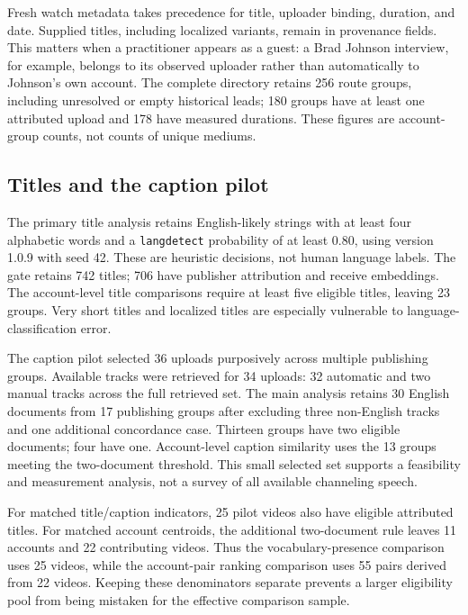 Fresh watch metadata takes precedence for title, uploader binding, duration, and date. Supplied titles, including localized variants, remain in provenance fields. This matters when a practitioner appears as a guest: a Brad Johnson interview, for example, belongs to its observed uploader rather than automatically to Johnson's own account. The complete directory retains 256 route groups, including unresolved or empty historical leads; 180 groups have at least one attributed upload and 178 have measured durations. These figures are account-group counts, not counts of unique mediums.

\begin{table}[t]
\centering

\caption{Coverage within the frozen index. Each row has its own unit and denominator; no row estimates a platform-wide population. Caption and matched-comparison subsets are described separately in the text.}
\label{tab:coverage}
\end{table}

\subsection{Titles and the caption pilot}
The primary title analysis retains English-likely strings with at least four alphabetic words and a \texttt{langdetect} probability of at least 0.80, using version 1.0.9 with seed 42. These are heuristic decisions, not human language labels. The gate retains 742 titles; 706 have publisher attribution and receive embeddings. The account-level title comparisons require at least five eligible titles, leaving 23 groups. Very short titles and localized titles are especially vulnerable to language-classification error.

The caption pilot selected 36 uploads purposively across multiple publishing groups. Available tracks were retrieved for 34 uploads: 32 automatic and two manual tracks across the full retrieved set. The main analysis retains 30 English documents from 17 publishing groups after excluding three non-English tracks and one additional concordance case. Thirteen groups have two eligible documents; four have one. Account-level caption similarity uses the 13 groups meeting the two-document threshold. This small selected set supports a feasibility and measurement analysis, not a survey of all available channeling speech.

For matched title/caption indicators, 25 pilot videos also have eligible attributed titles. For matched account centroids, the additional two-document rule leaves 11 accounts and 22 contributing videos. Thus the vocabulary-presence comparison uses 25 videos, while the account-pair ranking comparison uses 55 pairs derived from 22 videos. Keeping these denominators separate prevents a larger eligibility pool from being mistaken for the effective comparison sample.

